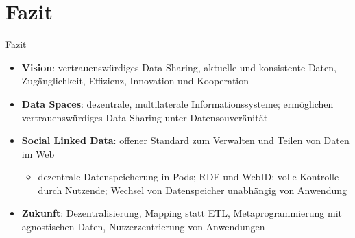
\section{Fazit}

\begin{frame}{Fazit}
    \begin{itemize}
        \item \textbf{Vision}: vertrauenswürdiges Data Sharing, aktuelle und konsistente Daten, Zugänglichkeit, Effizienz, Innovation und Kooperation
        
        \pause
        \item \textbf{Data Spaces}: dezentrale, multilaterale Informationssysteme; ermöglichen vertrauenswürdiges Data Sharing unter Datensouveränität
        
        \pause
        \item \textbf{Social Linked Data}: offener Standard zum Verwalten und Teilen von Daten im Web
        
        \pause
        \begin{itemize}
            \item dezentrale Datenspeicherung in Pods; RDF und WebID; volle Kontrolle durch Nutzende; Wechsel von Datenspeicher unabhängig von Anwendung
        \end{itemize}
        
        \pause
        \item \textbf{Zukunft}: Dezentralisierung, Mapping statt ETL, Metaprogrammierung mit agnostischen Daten, Nutzerzentrierung von Anwendungen
    \end{itemize}
\end{frame}
